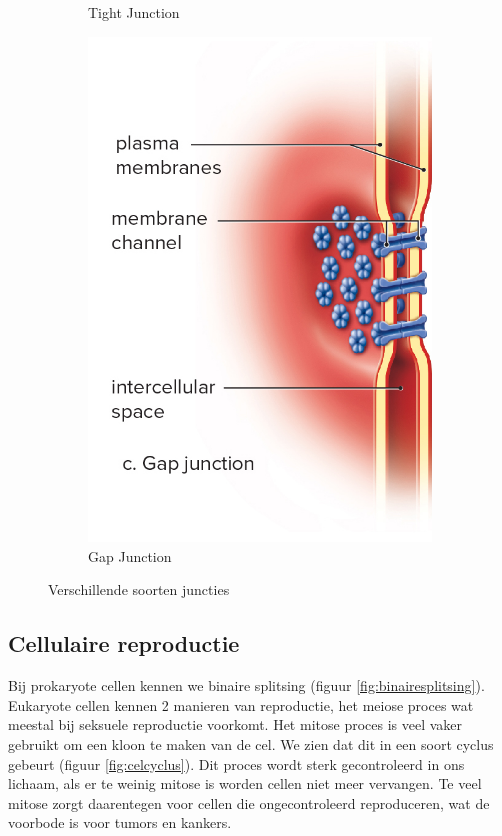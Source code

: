 \documentclass[a4paper,kul]{kulakarticle} %
\begin{document}
\begin{figure}[h]
\begin{subfigure}{.33\textwidth}
		\caption{Tight Junction}
		\label{fig:Tight}
	\end{subfigure}%
	\begin{subfigure}{.33\textwidth}
	\centering
	\includegraphics[width=0.7\linewidth]{Gap_Junctie}
	\caption{Gap Junction}
	\label{fig:Gap}
	\end{subfigure}
	\caption{Verschillende soorten juncties}
	\label{fig:Juncites}
\end{figure}
\subsection{Cellulaire reproductie}
Bij prokaryote cellen kennen we binaire splitsing (figuur \ref{fig:binairesplitsing}). Eukaryote cellen kennen 2 manieren van reproductie, het meiose proces wat meestal bij seksuele reproductie voorkomt. Het mitose proces is veel vaker gebruikt om een kloon te maken van de cel. We zien dat dit in een soort cyclus gebeurt (figuur \ref{fig:celcyclus}). Dit proces wordt sterk gecontroleerd in ons lichaam, als er te weinig mitose is worden cellen niet meer vervangen. Te veel mitose zorgt daarentegen voor cellen die ongecontroleerd reproduceren, wat de voorbode is voor tumors en kankers.  
\end{document}
